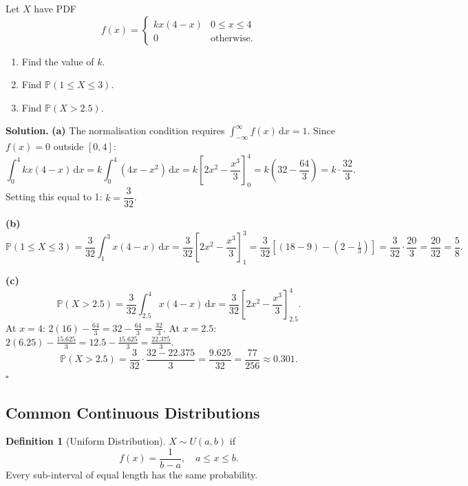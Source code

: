 \documentclass[12pt, a4paper, oneside]{book}
\theoremstyle{definition}
\newtheorem{definition}{Definition}[section]
\theoremstyle{plain}
\theoremstyle{remark}
\newcommand{\Prob}{\mathbb{P}}
\newenvironment{solution}
  {\par\medskip\noindent\textbf{Solution.}\quad}
  {\hfill$\square$\par\medskip}
\begin{document}
\begin{workedexample}
Let $X$ have PDF
\[
  f(x) = \begin{cases} kx(4-x) & 0 \le x \le 4 \\ 0 & \text{otherwise.} \end{cases}
\]
\begin{enumerate}[label=\textbf{(\alph*)}]
  \item Find the value of $k$.
  \item Find $\Prob(1 \le X \le 3)$.
  \item Find $\Prob(X > 2.5)$.
\end{enumerate}

\begin{solution}
\textbf{(a)}  The normalisation condition requires
$\int_{-\infty}^{\infty} f(x)\,\mathrm{d}x = 1$.  Since $f(x)=0$
outside $[0,4]$:
\[
  \int_0^4 kx(4-x)\,\mathrm{d}x = k\int_0^4 (4x - x^2)\,\mathrm{d}x
  = k\left[2x^2 - \frac{x^3}{3}\right]_0^4
  = k\!\left(32 - \frac{64}{3}\right) = k\cdot\frac{32}{3}.
\]
Setting this equal to 1: $k = \dfrac{3}{32}$.

\medskip
\textbf{(b)}
\[
  \Prob(1\le X\le 3) = \frac{3}{32}\int_1^3 x(4-x)\,\mathrm{d}x
  = \frac{3}{32}\left[2x^2 - \frac{x^3}{3}\right]_1^3
  = \frac{3}{32}\!\left[\left(18 - 9\right) - \left(2 - \tfrac{1}{3}\right)\right]
  = \frac{3}{32}\cdot\frac{20}{3} = \frac{20}{32} = \frac{5}{8}.
\]

\textbf{(c)}
\[
  \Prob(X > 2.5) = \frac{3}{32}\int_{2.5}^{4} x(4-x)\,\mathrm{d}x
  = \frac{3}{32}\left[2x^2 - \frac{x^3}{3}\right]_{2.5}^{4}.
\]
At $x=4$: $2(16)-\frac{64}{3} = 32 - \frac{64}{3} = \frac{32}{3}$.
At $x=2.5$: $2(6.25)-\frac{15.625}{3} = 12.5 - \frac{15.625}{3} = \frac{22.375}{3}$.
\[
  \Prob(X>2.5) = \frac{3}{32}\cdot\frac{32-22.375}{3} = \frac{9.625}{32}
  = \frac{77}{256} \approx 0.301.
\]
\end{solution}
\end{workedexample}

\subsection{Common Continuous Distributions}

\begin{definition}[Uniform Distribution]
$X \sim U(a,b)$ if
\[
  f(x) = \frac{1}{b-a}, \quad a \le x \le b.
\]
Every sub-interval of equal length has the same probability.
\end{definition}
\end{document}
